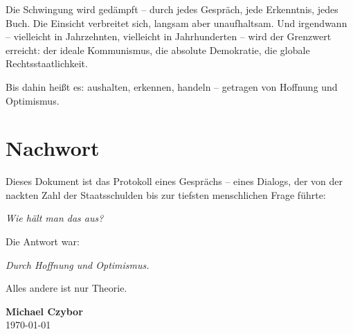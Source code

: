 \documentclass[12pt,a4paper]{book}
\begin{document}
Die Schwingung wird gedämpft – durch jedes Gespräch, jede Erkenntnis, jedes Buch. Die Einsicht verbreitet sich, langsam aber unaufhaltsam. Und irgendwann – vielleicht in Jahrzehnten, vielleicht in Jahrhunderten – wird der Grenzwert erreicht: der ideale Kommunismus, die absolute Demokratie, die globale Rechtsstaatlichkeit.

Bis dahin heißt es: aushalten, erkennen, handeln – getragen von Hoffnung und Optimismus.

\chapter*{Nachwort}

Dieses Dokument ist das Protokoll eines Gesprächs – eines Dialogs, der von der nackten Zahl der Staatsschulden bis zur tiefsten menschlichen Frage führte:

\emph{Wie hält man das aus?}

Die Antwort war:

\emph{Durch Hoffnung und Optimismus.}

Alles andere ist nur Theorie.

\medskip

\noindent \textbf{Michael Czybor} \\
\today
\end{document}
